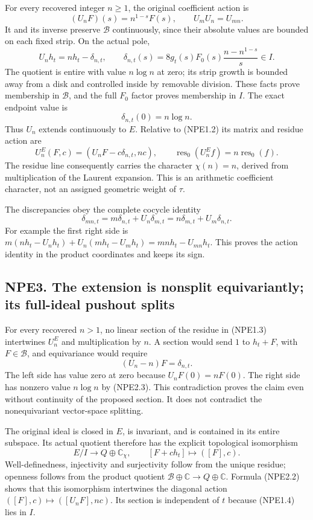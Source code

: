 For every recovered integer \(n\ge1\), the original coefficient action
is \[
(U_nF)(s)=n^{1-s}F(s),\qquad U_mU_n=U_{mn}.
\tag{NPE2.1}
\] It and its inverse preserve \(\mathcal B\) continuously, since their
absolute values are bounded on each fixed strip. On the actual pole, \[
U_nh_t=nh_t-\delta_{n,t},\qquad
\delta_{n,t}(s)=8g_t(s)F_0(s)\frac{n-n^{1-s}}s\in I.
\tag{NPE2.2}
\] The quotient is entire with value \(n\log n\) at zero; its strip
growth is bounded away from a disk and controlled inside by removable
division. These facts prove membership in \(\mathcal B\), and the full
\(F_0\) factor proves membership in \(I\). The exact endpoint value is
\[
\delta_{n,t}(0)=n\log n.
\tag{NPE2.3}
\] Thus \(U_n\) extends continuously to \(E\). Relative to (NPE1.2) its
matrix and residue action are \[
U_n^E(F,c)=(U_nF-c\delta_{n,t},nc),\qquad
\operatorname{res}_0(U_n^Ef)=n\operatorname{res}_0(f).
\tag{NPE2.4}
\] The residue line consequently carries the character \(\chi(n)=n\),
derived from multiplication of the Laurent expansion. This is an
arithmetic coefficient character, not an assigned geometric weight of
\(\tau\).

The discrepancies obey the complete cocycle identity \[
\delta_{mn,t}=m\delta_{n,t}+U_n\delta_{m,t}
=n\delta_{m,t}+U_m\delta_{n,t}.
\tag{NPE2.5}
\] For example the first right side is
\(m(nh_t-U_nh_t)+U_n(mh_t-U_mh_t)=mnh_t-U_{mn}h_t\). This proves the
action identity in the product coordinates and keeps its sign.

\subsection{NPE3. The extension is nonsplit equivariantly; its
full-ideal pushout
splits}\label{npe3.-the-extension-is-nonsplit-equivariantly-its-full-ideal-pushout-splits}

For every recovered \(n>1\), no linear section of the residue in
(NPE1.3) intertwines \(U_n^E\) and multiplication by \(n\). A section
would send \(1\) to \(h_t+F\), with \(F\in\mathcal B\), and equivariance
would require \[
(U_n-n)F=\delta_{n,t}.
\tag{NPE3.1}
\] The left side has value zero at zero because \(U_nF(0)=nF(0)\). The
right side has nonzero value \(n\log n\) by (NPE2.3). This contradiction
proves the claim even without continuity of the proposed section. It
does not contradict the nonequivariant vector-space splitting.

The original ideal is closed in \(E\), is invariant, and is contained in
its entire subspace. Its actual quotient therefore has the explicit
topological isomorphism \[
E/I\longrightarrow Q\oplus\mathbb C_\chi,
\qquad [F+ch_t]\longmapsto([F],c).
\tag{NPE3.2}
\] Well-definedness, injectivity and surjectivity follow from the unique
residue; openness follows from the product quotient
\(\mathcal B\oplus\mathbb C\to Q\oplus\mathbb C\). Formula (NPE2.2)
shows that this isomorphism intertwines the diagonal action
\(([F],c)\mapsto([U_nF],nc)\). Its section is independent of \(t\)
because (NPE1.4) lies in \(I\).

